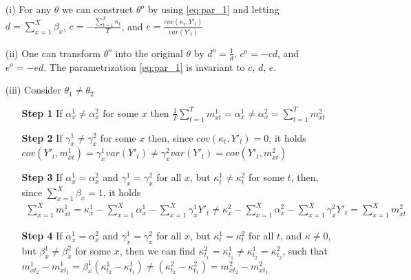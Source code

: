 \documentclass[AER, draftmode]{AEA}
\begin{document}
\begin{enumerate}
	\item[(i)] For any $\theta$ we can construct $\theta^o$ by using \ref{eq:par_1} and letting $ d = \sum_{x=1}^{X} \beta_x$, $ c = - \frac{\sum_{t=1}^{T} \kappa_t}{T}$, and $e = \frac{cov(\kappa_t, Y'_t)}{var(Y'_t)}$
	\item[(ii)] One can transform $\theta^o$ into the original $\theta$ by $d^o = \frac{1}{d}$, $c^o = -cd$, and $e^o = -ed$. The parametrization \ref{eq:par_1} is invariant to $c$, $d$, $e$.
	\item[(iii)] Consider $\theta_1 \neq \theta_2$
	\begin{enumerate}
		\item [\textbf{Step 1}] If $\alpha_x^1 \neq \alpha_x^2$ for some $x$ then $\frac{1}{T} \sum_{t=1}^{T} m_{xt}^1 = \alpha_x^1 \neq \alpha_x^2 = \sum_{t=1}^{T} m_{xt}^2$
		\item [\textbf{Step 2}] If $\gamma_x^1 \neq \gamma_x^2$ for some $x$ then, since $cov(\kappa_t, Y'_t)=0$, it holds $cov(Y'_t, m_{xt}^1)= \gamma_x^1 var(Y'_t) \neq \gamma_x^2 var(Y'_t) = cov(Y'_t, m_{xt}^2)$
		\item [\textbf{Step 3}] If $\alpha_x^1=\alpha_x^2$ and $\gamma_x^1=\gamma_x^2$ for all $x$, but $\kappa_t^1 \neq \kappa_t^2$ for some $t$, then, since $\sum_{x=1}^{X} \beta_x =1$, it holds
		\begin{align*}
		\sum_{x=1}^{X}m_{xt}^1 = \kappa_x^1 - \sum_{x=1}^{X} \alpha_x^1 - \sum_{x=1}^X \gamma_x^1 Y'_t \neq \kappa_x^2 - \sum_{x=1}^{X} \alpha_x^2 - \sum_{x=1}^X \gamma_x^2 Y'_t = \sum_{x=1}^{X}m_{xt}^2 
		\end{align*}
		\item [\textbf{Step 4}] If $\alpha_x^1=\alpha_x^2$ and $\gamma_x^1=\gamma_x^2$ for all $x$, but $\kappa_t^1 = \kappa_t^2$ for all $t$, and $\kappa \neq 0$, but $\beta_x^1 \neq \beta_x^2$ for some $x$, then we can find $\kappa_{t_1}^2 = \kappa_{t_1}^1 \neq \kappa_{t_2}^1 = \kappa_{t_2}^2$, such that $m_{xt_2}^1- m_{xt_1}^1 = \beta_x^1 (\kappa_{t_2}^1-\kappa_{t_1}^1) \neq (\kappa_{t_2}^2-\kappa_{t_1}^2) = m_{xt_2}^2- m_{xt_1}^2$
	\end{enumerate}
\end{enumerate}
\end{document}
